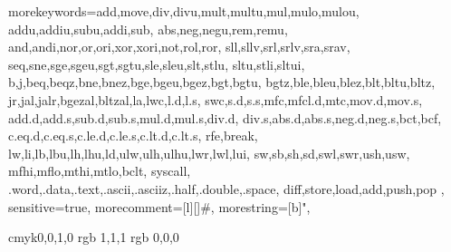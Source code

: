 %
%
  {morekeywords={add,move,div,divu,mult,multu,mul,mulo,mulou,%
      addu,addiu,subu,addi,sub,%
      abs,neg,negu,rem,remu,%
      and,andi,nor,or,ori,xor,xori,not,rol,ror,%
      sll,sllv,srl,srlv,sra,srav,%
      seq,sne,sge,sgeu,sgt,sgtu,sle,sleu,slt,stlu,%
      sltu,stli,sltui,%
      b,j,beq,beqz,bne,bnez,bge,bgeu,bgez,bgt,bgtu,%
      bgtz,ble,bleu,blez,blt,bltu,bltz,%
      jr,jal,jalr,bgezal,bltzal,la,lwc,l.d,l.s,%
      swc,s.d,s.s,mfc,mfcl.d,mtc,mov.d,mov.s,%
      add.d,add.s,sub.d,sub.s,mul.d,mul.s,div.d,%
      div.s,abs.d,abs.s,neg.d,neg.s,bct,bcf,%
      c.eq.d,c.eq.s,c.le.d,c.le.s,c.lt.d,c.lt.s,%
      rfe,break,%
      lw,li,lb,lbu,lh,lhu,ld,ulw,ulh,ulhu,lwr,lwl,lui,%
      sw,sb,sh,sd,swl,swr,ush,usw,%
      mfhi,mflo,mthi,mtlo,bclt,%
      syscall,%
      .word,.data,.text,.ascii,.asciiz,.half,.double,.space,%
      diff,store,load,add,push,pop%
      },%
   sensitive=true,%
   morecomment=[l][\color{blue}]{\#},%
   morestring=[b]",%
  }%
%
\lstset{basicstyle=\small\ttfamily, keywordstyle=\bfseries,
  commentstyle=\slshape, stringstyle=\itshape,
  extendedchars=true}


%
%
\definecolor{gelb}    {cmyk}{0,0,1,0}
\definecolor{weiss}   {rgb} {1,1,1}
\definecolor{schwarz} {rgb} {0,0,0}

%
%



